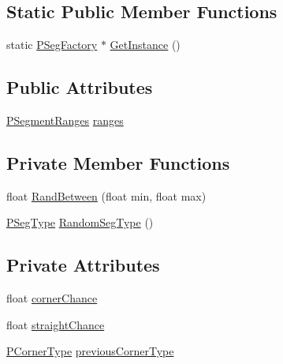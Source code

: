 \subsection*{Static Public Member Functions}
\begin{DoxyCompactItemize}
\item 
static \hyperlink{classprocedural_1_1_p_seg_factory}{P\-Seg\-Factory} $\ast$ \hyperlink{classprocedural_1_1_p_seg_factory_a8077e428ca776929d5c81d8b5def7813}{Get\-Instance} ()
\end{DoxyCompactItemize}
\subsection*{Public Attributes}
\begin{DoxyCompactItemize}
\item 
\hyperlink{classprocedural_1_1_p_segment_ranges}{P\-Segment\-Ranges} \hyperlink{classprocedural_1_1_p_seg_factory_a34fbc09f9aca697f61dbc8a7d1d8a2cd}{ranges}
\end{DoxyCompactItemize}
\subsection*{Private Member Functions}
\begin{DoxyCompactItemize}
\item 
float \hyperlink{classprocedural_1_1_p_seg_factory_a0a2ee118df418a9c4c1ce8002c8aecc6}{Rand\-Between} (float min, float max)
\item 
\hyperlink{namespaceprocedural_a50f6e9669ba957b95f24713757bd0f20}{P\-Seg\-Type} \hyperlink{classprocedural_1_1_p_seg_factory_a1d0086989b39a113b46432640a8a79a4}{Random\-Seg\-Type} ()
\end{DoxyCompactItemize}
\subsection*{Private Attributes}
\begin{DoxyCompactItemize}
\item 
float \hyperlink{classprocedural_1_1_p_seg_factory_a02557cf9cc05ee759b23a95e45126dd4}{corner\-Chance}
\item 
float \hyperlink{classprocedural_1_1_p_seg_factory_a6cc50e9c858c733ced48b220cc75fbed}{straight\-Chance}
\item 
\hyperlink{namespaceprocedural_ac5486560c59bdf79345a041628149e91}{P\-Corner\-Type} \hyperlink{classprocedural_1_1_p_seg_factory_afc00d8f9ae8554244639fb15db0f11d3}{previous\-Corner\-Type}
\end{DoxyCompactItemize}
